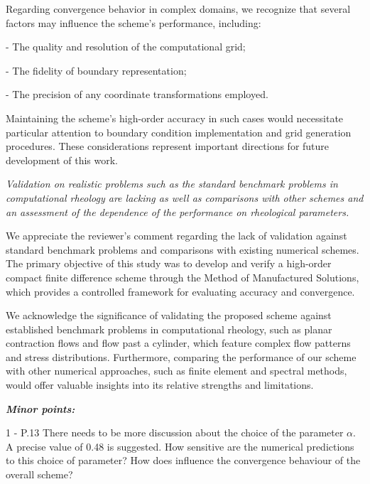 \documentclass[12pt]{article}
\begin{document}
Regarding convergence behavior in complex domains, we recognize that several factors may influence the scheme’s performance, including:

- The quality and resolution of the computational grid;

- The fidelity of boundary representation;

- The precision of any coordinate transformations employed.

Maintaining the scheme’s high-order accuracy in such cases would necessitate particular attention to boundary condition implementation and grid generation procedures. These considerations represent important directions for future development of this work.

\vspace{3mm}
{\it Validation on realistic problems such as the standard benchmark problems in computational rheology are lacking as well as comparisons with other schemes and an assessment of the dependence of the performance on rheological parameters.}
\vspace{3mm}

We appreciate the reviewer’s comment regarding the lack of validation against standard benchmark problems and comparisons with existing numerical schemes. The primary objective of this study was to develop and verify a high-order compact finite difference scheme through the Method of Manufactured Solutions, which provides a controlled framework for evaluating accuracy and convergence.

We acknowledge the significance of validating the proposed scheme against established benchmark problems in computational rheology, such as planar contraction flows and flow past a cylinder, which feature complex flow patterns and stress distributions. Furthermore, comparing the performance of our scheme with other numerical approaches, such as finite element and spectral methods, would offer valuable insights into its relative strengths and limitations.


\vspace{3mm}
{\it \textbf{Minor points:}

1 - P.13 There needs to be more discussion about the choice of the parameter $\alpha$. A precise value of 0.48 is suggested. How sensitive are the numerical predictions to this choice of parameter? How does influence the convergence behaviour of the overall scheme?}
\end{document}
